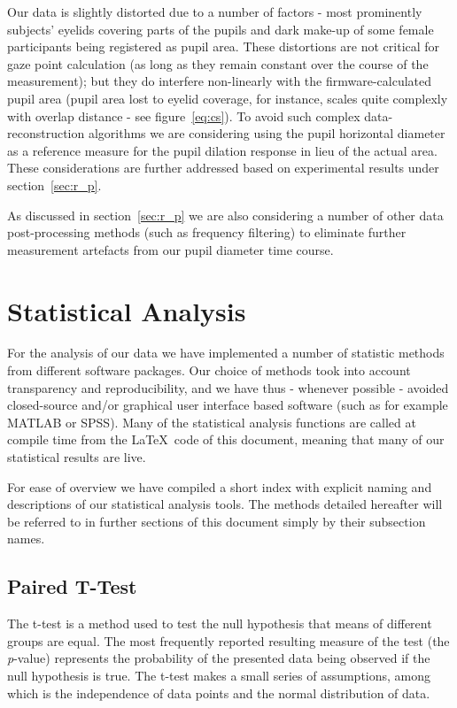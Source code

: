 	    Our data is slightly distorted due to a number of factors - most prominently subjects' eyelids covering parts of the pupils and dark make-up of some female participants being registered as pupil area.
	    These distortions are not critical for gaze point calculation (as long as they remain constant over the course of the measurement); 
	    but they do interfere non-linearly with the firmware-calculated pupil area 
	    (pupil area lost to eyelid coverage, for instance, scales quite complexly with overlap distance - see figure~\ref{eq:cs}).
	    To avoid such complex data-reconstruction algorithms we are considering using the pupil horizontal diameter as a reference measure for the pupil dilation response in lieu of the actual area.
	    These considerations are further addressed based on experimental results under section~\ref{sec:r_p}.
	    
	    As discussed in section~\ref{sec:r_p} we are also considering a number of other data post-processing methods (such as frequency filtering) to eliminate further measurement artefacts from our pupil diameter time course. 
    \section{Statistical Analysis}\label{sec:m_sa}
	For the analysis of our data we have implemented a number of statistic methods from different software packages.
	Our choice of methods took into account transparency and reproducibility, and we have thus - whenever possible - avoided closed-source and/or graphical user interface based software (such as for example MATLAB\textsuperscript{\small\textregistered} or SPSS\textsuperscript{\small\textregistered}).
	Many of the statistical analysis functions are called at compile time from the \LaTeX\ code of this document, meaning that many of our statistical results are live.
	
	For ease of overview we have compiled a short index with explicit naming and descriptions of our statistical analysis tools.
	The methods detailed hereafter will be referred to in further sections of this document simply by their subsection names.
	\subsection{Paired T-Test}\label{sec:m_sa_pt}
	    The t-test is a method used to test the null hypothesis that means of different groups are equal.
	    The most frequently reported resulting measure of the test (the \textit{p}-value) represents the probability of the presented data being observed if the null hypothesis is true. 
	    The t-test makes a small series of assumptions, among which is the independence of data points and the normal distribution of data.
	    
